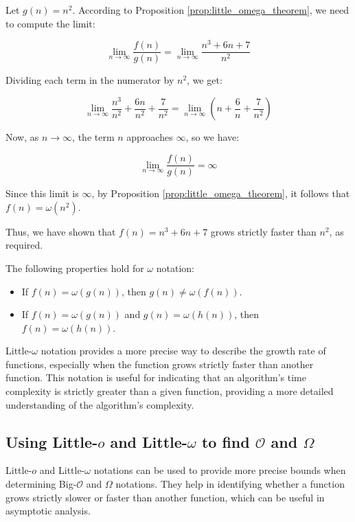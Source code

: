 \begin{solution}
    Let \( g(n) = n^2 \). According to Proposition \ref{prop:little_omega_theorem}, we need to compute the limit:
    
    \[
    \lim_{n \to \infty} \frac{f(n)}{g(n)} = \lim_{n \to \infty} \frac{n^3 + 6n + 7}{n^2}
    \]
    
    Dividing each term in the numerator by \( n^2 \), we get:
    
    \[
    \lim_{n \to \infty} \frac{n^3}{n^2} + \frac{6n}{n^2} + \frac{7}{n^2} = \lim_{n \to \infty} \left( n + \frac{6}{n} + \frac{7}{n^2} \right)
    \]
    
    Now, as \( n \to \infty \), the term \( n \) approaches \( \infty \), so we have:
    
    \[
    \lim_{n \to \infty} \frac{f(n)}{g(n)} = \infty
    \]
    
    Since this limit is \( \infty \), by Proposition \ref{prop:little_omega_theorem}, it follows that \( f(n) = \omega(n^2) \).
    
    Thus, we have shown that \( f(n) = n^3 + 6n + 7 \) grows strictly faster than \( n^2 \), as required.
\end{solution}

The following properties hold for $\omega$ notation:
\begin{itemize}
    \item If $f(n) = \omega(g(n))$, then $g(n) \neq \omega(f(n))$.
    \item If $f(n) = \omega(g(n))$ and $g(n) = \omega(h(n))$, then $f(n) = \omega(h(n))$.
\end{itemize}


Little-$\omega$ notation provides a more precise way to describe the growth rate of functions, especially when the function grows strictly faster than another function. This notation is useful for indicating that an algorithm's time complexity is strictly greater than a given function, providing a more detailed understanding of the algorithm's complexity. 

\subsection*{Using Little-\texorpdfstring{$o$}{o} and Little-\texorpdfstring{$\omega$}{omega} to find \texorpdfstring{$\mathcal{O}$}{O} and \texorpdfstring{$\Omega$}{Omega}}
Little-$o$ and Little-$\omega$ notations can be used to provide more precise bounds when determining Big-$\mathcal{O}$ and $\Omega$ notations. They help in identifying whether a function grows strictly slower or faster than another function, which can be useful in asymptotic analysis.

